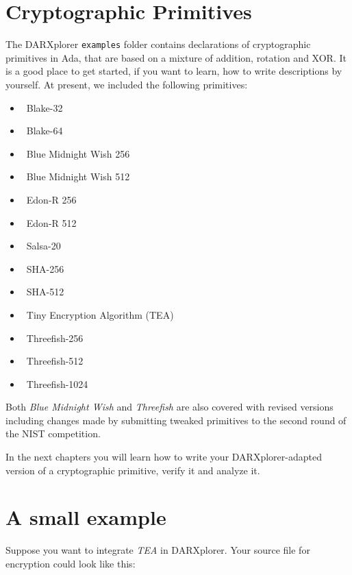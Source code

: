 \documentclass{acmtrans2m}
\begin{document}
\section{Cryptographic Primitives}
The DARXplorer \texttt{examples} folder contains declarations of cryptographic primitives in Ada, that are based on a mixture of addition, rotation and XOR. It is a good place to get started, if you want to learn, how to write descriptions by yourself. At present, we included the following primitives:
\begin{itemize}
	\item \ Blake-32
	\item \ Blake-64
	\item \ Blue Midnight Wish 256
	\item \ Blue Midnight Wish 512
	\item \ Edon-R 256
	\item \ Edon-R 512
	\item \ Salsa-20
	\item \ SHA-256
	\item \ SHA-512
	\item \ Tiny Encryption Algorithm (TEA)
	\item \ Threefish-256
	\item \ Threefish-512
	\item \ Threefish-1024
\end{itemize}

Both \textit{Blue Midnight Wish} and \textit{Threefish} are also covered with revised versions including changes made by submitting tweaked primitives to the second round of the NIST competition.

In the next chapters you will learn how to write your DARXplorer-adapted version of a
cryptographic primitive, verify it and analyze it.

\clearpage

\section{A small example}
Suppose you want to integrate \textit{TEA} in DARXplorer. Your source file for encryption could look like this:
\end{document}
